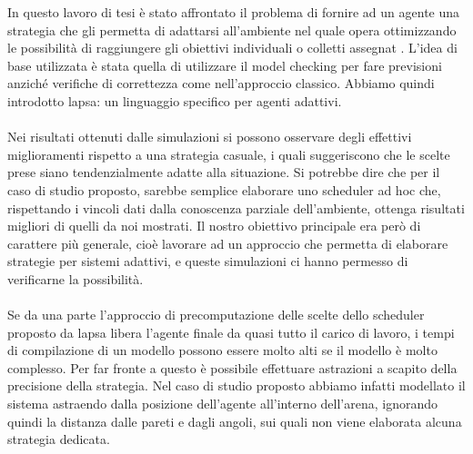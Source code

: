 In questo lavoro di tesi è stato affrontato il problema di fornire ad un agente una strategia che gli permetta di adattarsi all'ambiente nel quale opera ottimizzando le possibilit\`a di raggiungere gli obiettivi individuali o colletti assegnat . L'idea di base utilizzata è stata quella di utilizzare il model checking per fare previsioni anziché verifiche di correttezza come nell'approccio classico. Abbiamo quindi introdotto \ac{lapsa}: un linguaggio specifico per agenti adattivi.
\\ \\ %
Nei risultati ottenuti dalle simulazioni si possono osservare degli effettivi miglioramenti rispetto a una strategia casuale, i quali suggeriscono che le scelte prese siano tendenzialmente adatte alla situazione. Si potrebbe dire che per il caso di studio proposto, sarebbe semplice elaborare uno scheduler ad hoc che, rispettando i vincoli dati dalla conoscenza parziale dell'ambiente, ottenga risultati migliori di quelli da noi mostrati. Il nostro obiettivo principale era però di carattere più generale, cioè lavorare ad un approccio che permetta di elaborare strategie per sistemi adattivi, e queste simulazioni ci hanno permesso di verificarne la possibilità.
\\ \\ %
Se da una parte l'approccio di precomputazione delle scelte dello scheduler proposto da \ac{lapsa} libera l'agente finale da quasi tutto il carico di lavoro, i tempi di compilazione di un modello possono essere molto alti se il modello è molto complesso. Per far fronte a questo è possibile effettuare astrazioni a scapito della precisione della strategia. Nel caso di studio proposto abbiamo infatti modellato il sistema astraendo dalla posizione dell'agente all'interno dell'arena, ignorando quindi la distanza dalle pareti e dagli angoli, sui quali non viene elaborata alcuna strategia dedicata.

